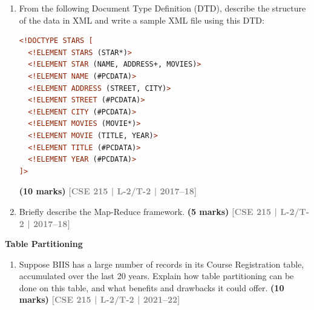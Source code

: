 \documentclass[12pt,a3paper]{article}
\newcommand{\yr}[1]{\hfill\textcolor{gray}{\small\textbf{[#1]}}}
\newcommand{\mk}[1]{\textcolor{orange!70!black}{\small\textbf{(#1 marks)}}}
\newcommand{\subtopic}[2]{%
  \vspace{10pt}
  \noindent\begin{tcolorbox}[colback=#1!8,colframe=#1,boxrule=0.6pt,arc=4pt,
    left=6pt,right=6pt,top=4pt,bottom=4pt]
    \small\bfseries\textcolor{#1}{#2}
  \end{tcolorbox}
  \vspace{2pt}
}
\begin{document}
\begin{enumerate}

\item From the following Document Type Definition (DTD), describe the structure of the data in XML and write a sample XML file using this DTD:
\begin{lstlisting}[language=XML,morekeywords={DOCTYPE,ELEMENT,PCDATA}]
<!DOCTYPE STARS [
  <!ELEMENT STARS (STAR*)>
  <!ELEMENT STAR (NAME, ADDRESS+, MOVIES)>
  <!ELEMENT NAME (#PCDATA)>
  <!ELEMENT ADDRESS (STREET, CITY)>
  <!ELEMENT STREET (#PCDATA)>
  <!ELEMENT CITY (#PCDATA)>
  <!ELEMENT MOVIES (MOVIE*)>
  <!ELEMENT MOVIE (TITLE, YEAR)>
  <!ELEMENT TITLE (#PCDATA)>
  <!ELEMENT YEAR (#PCDATA)>
]>
\end{lstlisting}
\mk{10} \yr{CSE 215 | L-2/T-2 | 2017--18}

\item Briefly describe the Map-Reduce framework.
\mk{5} \yr{CSE 215 | L-2/T-2 | 2017--18}

\end{enumerate}

\subtopic{cE}{Table Partitioning}
\label{sub:s8-partition}

\begin{enumerate}

\item Suppose BIIS has a large number of records in its Course Registration table, accumulated over the last 20 years. Explain how table partitioning can be done on this table, and what benefits and drawbacks it could offer.
\mk{10} \yr{CSE 215 | L-2/T-2 | 2021--22}

\end{enumerate}
\end{document}

